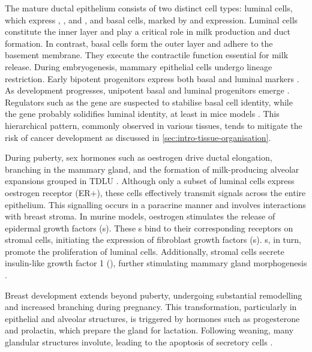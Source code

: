 The mature ductal epithelium consists of two distinct cell types: luminal cells, which express , , and , and basal cells, marked by  and  expression. Luminal cells constitute the inner layer and play a critical role in milk production and duct formation. In contrast, basal cells form the outer layer and adhere to the basement membrane. They execute the contractile function essential for milk release. During embryogenesis, mammary epithelial cells undergo lineage restriction. Early bipotent progenitors express both basal and luminal markers \parencite{Stingl2001-cb,Prater2014-qd,Rios2014-jj}. As development progresses, unipotent basal and luminal progenitors emerge \parencite{Van_Keymeulen2011-um,Rios2014-jj,Tao2014-ol}. Regulators such as the  gene are suspected to stabilise basal cell identity, while the  gene probably solidifies luminal identity, at least in mice models  \parencite{Spina2021-ej}. This hierarchical pattern, commonly observed in various tissues, tends to mitigate the risk of cancer development as discussed in \cref{sec:intro-tissue-organisation}.

During puberty, sex hormones such as oestrogen drive ductal elongation, branching in the mammary gland, and the formation of milk-producing alveolar expansions grouped in \acf{TDLU} . Although only a subset of luminal cells express oestrogen receptor (ER+), these cells effectively transmit signals across the entire epithelium. This signalling occurs in a paracrine manner and involves interactions with breast stroma.
In murine models, oestrogen stimulates the release of epidermal growth factors (s). These s bind to their corresponding receptors on stromal cells, initiating the expression of fibroblast growth factors (s). s, in turn, promote the proliferation of luminal cells. Additionally, stromal cells secrete insulin-like growth factor 1 (), further stimulating mammary gland morphogenesis \parencite{Macias2012-su}.

Breast development extends beyond puberty, undergoing substantial remodelling and increased branching during pregnancy. This transformation, particularly in epithelial and alveolar structures, is triggered by hormones such as progesterone and prolactin, which prepare the gland for lactation. Following weaning, many glandular structures involute, leading to the apoptosis of secretory cells \parencite{Macias2012-su}.

